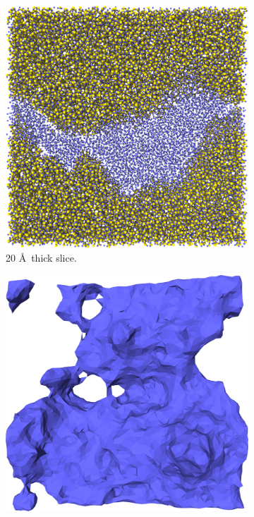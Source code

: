 \begin{figure}[!p]
{\begin{subfigure}[t]{\myfigwidth}
            \includegraphics[width=\textwidth]{images/systems/trimmed-rough_fracture01_abel_16}%
            \caption{20 \AA\ thick slice.}%
        \end{subfigure}%
        \hspace{\myhfillwidth}%
        \begin{subfigure}[t]{\myfigwidth}%
            \centering%
            \includegraphics[width=\textwidth]{images/systems/trimmed-rough_fracture01_abel_22}%

\end{subfigure}}
\end{figure}
